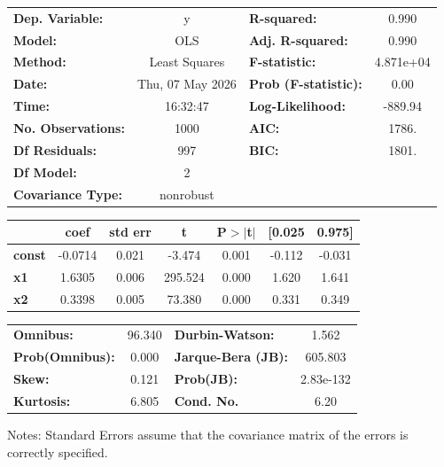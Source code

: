 \begin{center}
\begin{tabular}{lclc}
\toprule
\textbf{Dep. Variable:}    &        y         & \textbf{  R-squared:         } &     0.990   \\
\textbf{Model:}            &       OLS        & \textbf{  Adj. R-squared:    } &     0.990   \\
\textbf{Method:}           &  Least Squares   & \textbf{  F-statistic:       } & 4.871e+04   \\
\textbf{Date:}             & Thu, 07 May 2026 & \textbf{  Prob (F-statistic):} &     0.00    \\
\textbf{Time:}             &     16:32:47     & \textbf{  Log-Likelihood:    } &   -889.94   \\
\textbf{No. Observations:} &        1000      & \textbf{  AIC:               } &     1786.   \\
\textbf{Df Residuals:}     &         997      & \textbf{  BIC:               } &     1801.   \\
\textbf{Df Model:}         &           2      & \textbf{                     } &             \\
\textbf{Covariance Type:}  &    nonrobust     & \textbf{                     } &             \\
\bottomrule
\end{tabular}
\begin{tabular}{lcccccc}
               & \textbf{coef} & \textbf{std err} & \textbf{t} & \textbf{P$> |$t$|$} & \textbf{[0.025} & \textbf{0.975]}  \\
\midrule
\textbf{const} &      -0.0714  &        0.021     &    -3.474  &         0.001        &       -0.112    &       -0.031     \\
\textbf{x1}    &       1.6305  &        0.006     &   295.524  &         0.000        &        1.620    &        1.641     \\
\textbf{x2}    &       0.3398  &        0.005     &    73.380  &         0.000        &        0.331    &        0.349     \\
\bottomrule
\end{tabular}
\begin{tabular}{lclc}
\textbf{Omnibus:}       & 96.340 & \textbf{  Durbin-Watson:     } &     1.562  \\
\textbf{Prob(Omnibus):} &  0.000 & \textbf{  Jarque-Bera (JB):  } &   605.803  \\
\textbf{Skew:}          &  0.121 & \textbf{  Prob(JB):          } & 2.83e-132  \\
\textbf{Kurtosis:}      &  6.805 & \textbf{  Cond. No.          } &      6.20  \\
\bottomrule
\end{tabular}
\end{center}

Notes: \newline
 [1] Standard Errors assume that the covariance matrix of the errors is correctly specified.